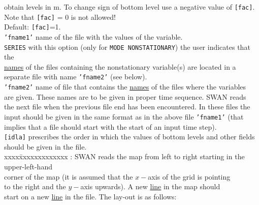 \documentclass[12pt]{book}
\begin{document}
\begin{tabbing}
                       obtain levels in m. To change sign of bottom level use a negative value of {\tt [fac]}.\\
                       Note that {\tt [fac]} = 0 is not allowed!\\
                       Default: {\tt [fac]}=1.\-\\
{\tt 'fname1'}      \> name of the file with the values of the variable.\\
{\tt SERIES}        \> with this option (only for {\tt MODE NONSTATIONARY}) the user indicates that the\+\\
                       \underline{names} of the files containing the nonstationary variable(s) are located in a\\
                       separate file with name {\tt 'fname2'} (see below).\-\\
{\tt 'fname2'}      \> name of file that contains the \underline{names} of the files where the variables\+\\
                       are given. These names are to be given in proper time sequence. SWAN reads\\
                       the next file when the previous file end has been encountered. In these files the\\
                       input should be given in the same format as in the above file {\tt 'fname1'} (that\\
                       implies that a file should start with the start of an input time step).\-\\
{\tt [idla]}        \> prescribes the order in which the values of bottom levels and other fields\+\\
                       should be given in the file.\\
                       \pushtabs
                       xxxx\=xxxxxxxxxxxxx : \> SWAN reads the map from left to right starting in the upper-left-hand\+\\
                              corner of the map (it is assumed that the $x-$axis of the grid is pointing\\
                              to the right and the $y-$axis upwards). A new \underline{line} in the map should\\
                              start on a new \underline{line} in the file. The lay-out is as follows:\\
                              \\
                              \pushtabs

\end{tabbing}
\end{document}
